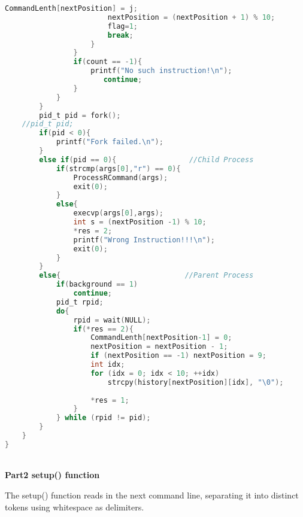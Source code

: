 \documentclass[12pt,a4paper]{article}
\begin{document}
\begin{lstlisting}[language=C]
                        CommandLenth[nextPosition] = j;
                        nextPosition = (nextPosition + 1) % 10;
                        flag=1;
                        break;
                    }
                }
                if(count == -1){
                    printf("No such instruction!\n");
                       continue;
                }
            }
        }
        pid_t pid = fork();
    //pid_t pid;
        if(pid < 0){
            printf("Fork failed.\n");
        }
        else if(pid == 0){                 //Child Process
            if(strcmp(args[0],"r") == 0){
                ProcessRCommand(args);
                exit(0);
            }
            else{
                execvp(args[0],args);
                int s = (nextPosition -1) % 10;
                *res = 2;
                printf("Wrong Instruction!!!\n");
                exit(0);
            }
        }
        else{                             //Parent Process
            if(background == 1)
                continue;
            pid_t rpid;
            do{
                rpid = wait(NULL);
                if(*res == 2){
                    CommandLenth[nextPosition-1] = 0;
                    nextPosition = nextPosition - 1;
                    if (nextPosition == -1) nextPosition = 9;
                    int idx;
                    for (idx = 0; idx < 10; ++idx)
                        strcpy(history[nextPosition][idx], "\0");
                        
                    *res = 1;
                }
            } while (rpid != pid);
        }
    }
}
\end{lstlisting}

~\\
\textbf{Part2 setup() function}

The setup() function reads in the next command line, separating it into distinct tokens using whitespace as delimiters. 
\end{document}

